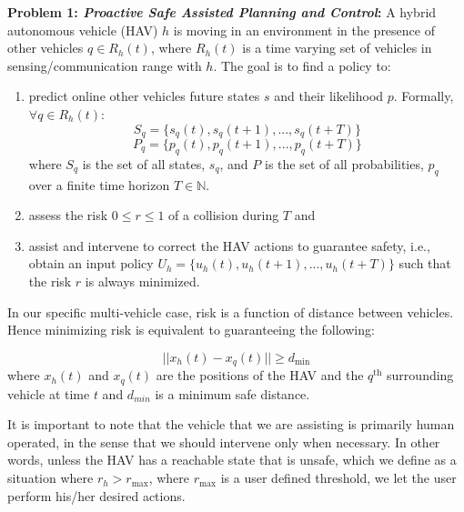 \documentclass[letterpaper, 10 pt, conference]{ieeeconf}  %
\newcommand\NB[1]{$\spadesuit$\footnote{NB: #1}}
\newcommand*{\N}{\mathbb{N}}
\begin{document}
\textbf{Problem 1: \textit{Proactive Safe Assisted Planning and Control}:} 
      A hybrid autonomous vehicle (HAV) $h$ is moving in an environment in the presence of other vehicles $q \in R_h(t)$, where $R_h(t)$ is a time varying set of vehicles in sensing/communication range with $h$. The goal is to find a policy to:
    \begin{enumerate}
        \item  predict online other vehicles future states $s$ and their likelihood $p$. Formally, $\forall q \in R_h(t)$:
    \begin{equation}
   S_q=\{{s_q(t), s_q(t+1),..., s_q(t+T)}\}
       \end{equation}
       \begin{equation}
   P_q=\{{p_q(t), p_q(t+1),..., p_q(t+T)}\}
    \end{equation}
     where $S_q$ is the set of all states, $s_q$, and $P$ is the set of all probabilities, $p_q$ over a finite time horizon $T\in\N$.  
    \item assess the risk $0\leq r \leq1$ of a collision during $T$ and
    \item assist and intervene to correct the HAV actions to guarantee safety, i.e., obtain an input policy $U_h=\{{u_h(t), u_h(t+1),..., u_h(t+T)}\}$ such that the risk $r$ is always minimized. 
    \end{enumerate}
   In our specific multi-vehicle case, risk is a function of distance between vehicles. Hence minimizing risk is equivalent to guaranteeing the following:
    
    \begin{equation}
        ||{x_h(t)-x_q(t)}|| \geq d_{\textrm{min}}
    \end{equation}
     where $x_h(t)$ and $x_q(t)$ are the positions of the HAV and the $q^{\textrm{th}}$ surrounding vehicle at time $t$ and $d_{min}$ is a minimum safe distance.    
    
    It is important to note that the vehicle that we are assisting is primarily human operated, in the sense that we should intervene only when necessary. %
    In other words, unless the HAV has a reachable state that is unsafe, which we define as a situation where $r_h>r_\max$, where $r_\max$ is a user defined threshold, we let the user perform his/her desired actions.
\end{document}
